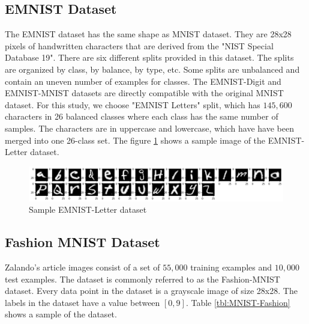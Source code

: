 \subsection{EMNIST Dataset}
The EMNIST dataset has the same shape as MNIST dataset. They are 28x28 pixels of handwritten characters that are derived from the "NIST Special Database 19". There are six different splits provided in this dataset. The splits are organized by class, by balance, by type, etc. Some splits are unbalanced and contain an uneven number of examples for classes. The EMNIST-Digit and EMNIST-MNIST datasets are directly compatible with the original MNIST dataset. For this study, we choose "EMNIST Letters" split, which has $145,600$ characters in 26 balanced classes where each class has the same number of samples. The characters are in uppercase and lowercase, which have have been merged into one 26-class set.
The figure \ref{fig:emnist-letter} shows a sample image of the EMNIST-Letter dataset.

\begin{figure}[htb!]
        \centering
    
            \centering
            \includegraphics[width=\linewidth]{images/letter.png}
            \caption{Sample EMNIST-Letter dataset}
            \label{fig:EMNIST MNIST dataset}
        \label{fig:emnist-letter}
    \end{figure}
    \FloatBarrier

    
\subsection{Fashion MNIST Dataset}
Zalando's article images consist of a set of $55,000$ training examples and $10,000$ test examples. The dataset is commonly referred to as the Fashion-MNIST dataset. Every data point in the dataset is a grayscale image of size 28x28. The labels in the dataset have a value between $[0, 9]$. Table \ref{tbl:MNIST-Fashion} shows a sample of the dataset.

